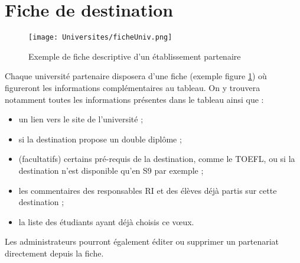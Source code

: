  \section{Fiche de destination}
 \label{sec::sheet_univ}
 
 \begin{figure}[H]
 	\centerline{\texttt{[image: Universites/ficheUniv.png]}}
 	\caption{Exemple de fiche descriptive d'un établissement partenaire}
 	\label{fig::fiche_uni}
 \end{figure}
 
 Chaque université partenaire disposera d'une fiche (exemple figure \ref{fig::fiche_uni}) où figureront les informations complémentaires au tableau.
 On y trouvera notamment toutes les informations présentes dans le tableau ainsi que :
 \begin{itemize}
 	\item un lien vers le site de l'université ;
 	\item si la destination propose un double diplôme ;
 	\item (facultatifs) certains pré-requis de la destination, comme le TOEFL, ou si la destination n'est disponible qu'en S9 par exemple ;
 	\item les commentaires des responsables RI et des élèves déjà partis sur cette destination ;
 	\item la liste des étudiants ayant déjà choisis ce vœux.
 \end{itemize}
 

 
 Les administrateurs pourront également éditer ou supprimer un partenariat directement depuis la fiche.